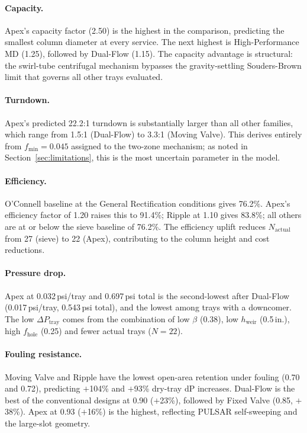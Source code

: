 \documentclass[11pt,letterpaper]{article}
\newcommand{\dpt}{\Delta P_{\mathrm{tray}}}
\begin{document}
\paragraph{Capacity.}
Apex's capacity factor (2.50) is the highest in the comparison, predicting
the smallest column diameter at every service.  The next highest is
High-Performance MD (1.25), followed by Dual-Flow (1.15).  The capacity
advantage is structural: the swirl-tube centrifugal mechanism bypasses the
gravity-settling Souders-Brown limit that governs all other trays evaluated.

\paragraph{Turndown.}
Apex's predicted 22.2:1 turndown is substantially larger than all other
families, which range from 1.5:1 (Dual-Flow) to 3.3:1 (Moving Valve).  This
derives entirely from $f_{\mathrm{min}} = 0.045$ assigned to the two-zone
mechanism; as noted in Section~\ref{sec:limitations}, this is the most
uncertain parameter in the model.

\paragraph{Efficiency.}
O'Connell baseline at the General Rectification conditions gives 76.2\%.
Apex's efficiency factor of 1.20 raises this to 91.4\%; Ripple at 1.10 gives
83.8\%; all others are at or below the sieve baseline of 76.2\%.  The
efficiency uplift reduces $N_{\mathrm{actual}}$ from 27 (sieve) to 22 (Apex),
contributing to the column height and cost reductions.

\paragraph{Pressure drop.}
Apex at 0.032\,psi/tray and 0.697\,psi total is the second-lowest after
Dual-Flow (0.017\,psi/tray, 0.543\,psi total), and the lowest among trays
with a downcomer.  The low $\dpt$ comes from the combination of low $\beta$
(0.38), low $h_{\mathrm{weir}}$ (0.5\,in.), high $f_{\mathrm{hole}}$ (0.25)
and fewer actual trays ($N = 22$).

\paragraph{Fouling resistance.}
Moving Valve and Ripple have the lowest open-area retention under fouling
(0.70 and 0.72), predicting $+$104\% and $+$93\% dry-tray dP increases.
Dual-Flow is the best of the conventional designs at 0.90 ($+$23\%), followed
by Fixed Valve (0.85, $+$38\%).  Apex at 0.93 ($+$16\%) is the highest,
reflecting PULSAR self-sweeping and the large-slot geometry.
\end{document}
